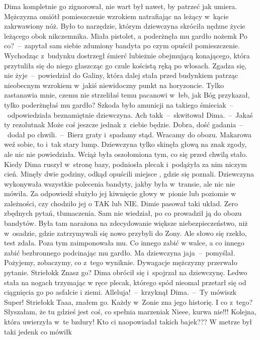 \documentclass[../MAIN.tex]{subfiles}
\begin{document}
Dima kompletnie go zignorował, nie wart był nawet, by patrzeć jak umiera.
Mężczyzna omiótł pomieszczenie wzrokiem natrafiając na leżący w~kącie
zakrwawiony nóż. Było to narzędzie, którym dziewczyna skróciła nędzne życie
leżącego obok nikczemnika.
\sd
\xx  Miała pistolet, a poderżnęła mu gardło nożem\3k Po co?~--~zapytał sam siebie zdumiony bandyta po czym opuścił
pomieszczenie.
\qd
Wychodząc z~budynku dostrzegł śmierć lubieżnie obejmującą
konającego, która przytuliła się do niego głaszcząc go czule kościstą ręką po
włosach.
\sx
Zgadza się, nie żyje~--~powiedział do Galiny, która dalej stała przed
budynkiem patrząc nieobecnym wzrokiem w~jakiś niewidoczny punkt na horyzoncie.
Tylko zastanawia mnie, czemu nie strzeliłaś temu pacanowi w~łeb, jak Bóg
przykazał, tylko poderżnęłaś mu gardło?
\xx  Szkoda było amunicji na takiego śmiecia\3k~--~odpowiedziała beznamiętnie
dziewczyna.
\xx  Ach tak\3k~--~skwitował Dima.~--~Jakaś ty rezolutna\3k Może coś jeszcze
jednak z~ciebie będzie. Dobra, dość
gadania~--~dodał po chwili.~--~Bierz graty i~spadamy stąd. Wracamy do obozu.
Makarowa weź sobie, to i~tak
stary lump.
\qm
Dziewczyna tylko skinęła głową na znak zgody, ale nic nie powiedziała. Wciąż
była oszołomiona tym, co się przed chwilą stało. Kiedy Dima ruszył w~stronę
bazy, podniosła plecak i~podążyła za nim niczym cień.
Minęły dwie godziny, odkąd opuścili miejsce , gdzie się poznali. Dziewczyna
wykonywała wszystkie polecenia bandyty, jakby była w~transie, ale nic nie
mówiła. Za odpowiedź służyło jej kiwnięcie głowy w~pionie lub poziomie w
zależności, czy chodziło jej o TAK lub NIE.
Dimie pasował taki układ. Zero zbędnych pytań, tłumaczenia. Sam nie wiedział, po
co prowadził ją do obozu bandytów. Była tam narażona na zdecydowanie większe
niebezpieczeństwo, niż w~osadzie, gdzie zatrzymywali się nowo przybyli do Zony.
Ale słowo się rzekło, test zdała. Poza tym zaimponowała mu. Co innego zabić w
walce, a co innego zabić bezbronnego podcinając mu gardło.
\sd \xx  Ma dziewczyna jaja~--~pomyślał.
\qd
Pożyjemy, zobaczymy, co z~tego wyniknie. Dywagacje mężczyzny przerwało
pytanie.
\sx Striełok\3k Znasz go?
\qm
Dima obrócił się i~spojrzał na dziewczynę. Ledwo stała na nogach trzymając w
ręce plecak, którego spód nieomal przetarł się od ciągnięcia go po asfalcie i
ziemi.
\sx Alleluja!~--~krzyknął Dima.~--~Ty mówisz\3k Super! Striełok\3k Taaa,
znałem go. Każdy w~Zonie zna jego historię. I co z~tego?
\xx  Słyszałam, że tu gdzieś jest coś, co spełnia marzenia\3k
\xx  Nieee, kurwa nie!!! Kolejna, która uwierzyła w~te bzdury! Kto ci naopowiadał
takich bajek???
\xx  W metrze był taki jeden\3k co mówił\3k
\end{document}
